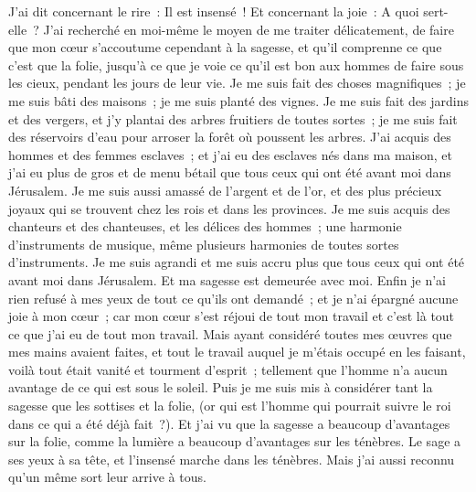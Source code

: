 \begin{multicols}{2}
J'ai dit concernant le rire~: Il est insensé~! Et concernant la joie~: A quoi sert-elle~?
J'ai recherché en moi-même le moyen de me traiter délicatement, de faire que mon cœur s'accoutume cependant à la sagesse, et qu'il comprenne ce que c'est que la folie, jusqu'à ce que je voie ce qu'il est bon aux hommes de faire sous les cieux, pendant les jours de leur vie.
Je me suis fait des choses magnifiques~; je me suis bâti des maisons~; je me suis planté des vignes.
Je me suis fait des jardins et des vergers, et j'y plantai des arbres fruitiers de toutes sortes~;
je me suis fait des réservoirs d'eau pour arroser la forêt où poussent les arbres.
J'ai acquis des hommes et des femmes esclaves~; et j'ai eu des esclaves nés dans ma maison, et j'ai eu plus de gros et de menu bétail que tous ceux qui ont été avant moi dans Jérusalem.
Je me suis aussi amassé de l'argent et de l'or, et des plus précieux joyaux qui se trouvent chez les rois et dans les provinces. Je me suis acquis des chanteurs et des chanteuses, et les délices des hommes~; une harmonie d'instruments de musique, même plusieurs harmonies de toutes sortes d'instruments.
Je me suis agrandi et me suis accru plus que tous ceux qui ont été avant moi dans Jérusalem. Et ma sagesse est demeurée avec moi.
Enfin je n'ai rien refusé à mes yeux de tout ce qu'ils ont demandé~; et je n'ai épargné aucune joie à mon cœur~; car mon cœur s'est réjoui de tout mon travail et c'est là tout ce que j'ai eu de tout mon travail.
Mais ayant considéré toutes mes œuvres que mes mains avaient faites, et tout le travail auquel je m'étais occupé en les faisant, voilà tout était vanité et tourment d'esprit~; tellement que l'homme n'a aucun avantage de ce qui est sous le soleil.
Puis je me suis mis à considérer tant la sagesse que les sottises et la folie, (or qui est l'homme qui pourrait suivre le roi dans ce qui a été déjà fait~?).
Et j'ai vu que la sagesse a beaucoup d'avantages sur la folie, comme la lumière a beaucoup d'avantages sur les ténèbres.
Le sage a ses yeux à sa tête, et l'insensé marche dans les ténèbres. Mais j'ai aussi reconnu qu'un même sort leur arrive à tous.

\end{multicols}
